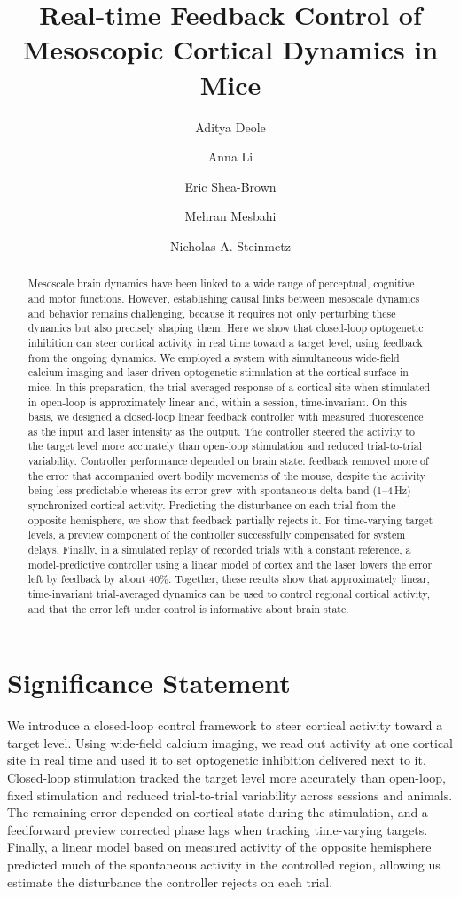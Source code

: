 \documentclass[10pt]{article}
\title{\textbf{Real-time Feedback Control of Mesoscopic Cortical Dynamics in Mice }}
\author{Aditya Deole}
\author{Anna Li}
\author{Eric Shea-Brown}
\author{Mehran Mesbahi}
\author{Nicholas A. Steinmetz}
\affil{University of Washington, Seattle, WA, USA}
\date{}
\theoremstyle{remark}
\begin{document}
\maketitle
\linenumbers

\begin{abstract}
Mesoscale brain dynamics have been linked to a wide range of perceptual, cognitive and motor functions.
However, establishing causal links between mesoscale dynamics and behavior remains challenging, because it requires not only perturbing these dynamics but also precisely shaping them.
Here we show that closed-loop optogenetic inhibition can steer cortical activity in real time toward a target level, using feedback from the ongoing dynamics. We employed a system with simultaneous wide-field calcium imaging and laser-driven optogenetic stimulation at the cortical surface in mice.
In this preparation, the trial-averaged response of a cortical site when stimulated in open-loop is approximately linear and, within a session, time-invariant.
On this basis, we designed a closed-loop linear feedback controller with measured fluorescence as the input and laser intensity as the output.
The controller steered the activity to the target level more accurately than open-loop stimulation and reduced trial-to-trial variability.
Controller performance depended on brain state:
feedback removed more of the error that accompanied overt bodily movements of the mouse, despite the activity being less predictable whereas its error grew with spontaneous delta-band (1--4\,Hz) synchronized cortical activity. 
Predicting the disturbance on each trial from the opposite hemisphere, we show that feedback partially rejects it.
For time-varying target levels, a preview component of the controller successfully compensated for system delays.
Finally, in a simulated replay of recorded trials with a constant reference, a model-predictive controller using a linear model of cortex and the laser lowers the error left by feedback by about 40\%.
Together, these results show that approximately linear, time-invariant trial-averaged dynamics can be used to control regional cortical activity, and that the error left under control is informative about brain state.
\end{abstract}


\section*{Significance Statement}
We introduce a closed-loop control framework to steer cortical activity toward a target level. 
Using wide-field calcium imaging, we read out activity at one cortical site in real time and used it to set optogenetic inhibition delivered next to it. 
Closed-loop stimulation tracked the target level more accurately than open-loop, fixed stimulation and reduced trial-to-trial variability across sessions and animals.
The remaining error depended on cortical state during the stimulation, and a feedforward preview corrected phase lags when tracking time-varying targets. 
Finally, a linear model based on measured activity of the opposite hemisphere predicted much of the spontaneous activity in the controlled region, allowing us estimate the disturbance the controller rejects on each trial.











\end{document}
